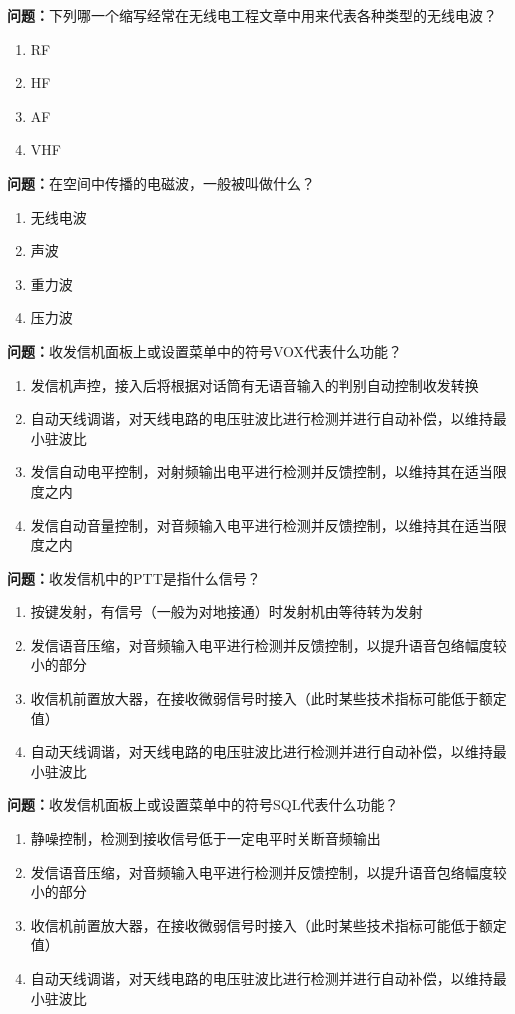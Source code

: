 \documentclass{ctexbook}
\begin{document}
\textbf{问题：}下列哪一个缩写经常在无线电工程文章中用来代表各种类型的无线电波？
\begin{enumerate}[label=\Alph*), leftmargin=3em]
\item RF
\item HF
\item AF
\item VHF
\end{enumerate}

\textbf{问题：}在空间中传播的电磁波，一般被叫做什么？
\begin{enumerate}[label=\Alph*), leftmargin=3em]
\item 无线电波
\item 声波
\item 重力波
\item 压力波
\end{enumerate}

\textbf{问题：}收发信机面板上或设置菜单中的符号VOX代表什么功能？
\begin{enumerate}[label=\Alph*), leftmargin=3em]
\item 发信机声控，接入后将根据对话筒有无语音输入的判别自动控制收发转换
\item 自动天线调谐，对天线电路的电压驻波比进行检测并进行自动补偿，以维持最小驻波比
\item 发信自动电平控制，对射频输出电平进行检测并反馈控制，以维持其在适当限度之内
\item 发信自动音量控制，对音频输入电平进行检测并反馈控制，以维持其在适当限度之内
\end{enumerate}

\textbf{问题：}收发信机中的PTT是指什么信号？
\begin{enumerate}[label=\Alph*), leftmargin=3em]
\item 按键发射，有信号（一般为对地接通）时发射机由等待转为发射
\item 发信语音压缩，对音频输入电平进行检测并反馈控制，以提升语音包络幅度较小的部分
\item 收信机前置放大器，在接收微弱信号时接入（此时某些技术指标可能低于额定值）
\item 自动天线调谐，对天线电路的电压驻波比进行检测并进行自动补偿，以维持最小驻波比
\end{enumerate}

\textbf{问题：}收发信机面板上或设置菜单中的符号SQL代表什么功能？
\begin{enumerate}[label=\Alph*), leftmargin=3em]
\item 静噪控制，检测到接收信号低于一定电平时关断音频输出
\item 发信语音压缩，对音频输入电平进行检测并反馈控制，以提升语音包络幅度较小的部分
\item 收信机前置放大器，在接收微弱信号时接入（此时某些技术指标可能低于额定值）
\item 自动天线调谐，对天线电路的电压驻波比进行检测并进行自动补偿，以维持最小驻波比
\end{enumerate}
\end{document}
